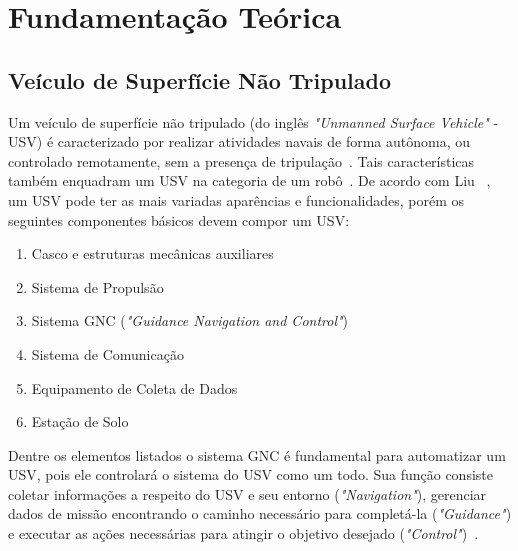 \chapter{Fundamentação Teórica}\label{chap2:fund_teo}
    \section{Veículo de Superfície Não Tripulado}\label{subchap2:USV}
        Um veículo de superfície não tripulado (do inglês \textit{"Unmanned Surface Vehicle"} - USV) é caracterizado por realizar atividades navais de forma autônoma, ou controlado remotamente, sem a presença de tripulação~\cite{LIU201671}. Tais características também enquadram um USV na categoria de um robô~\cite{JURAK2020}.
        De acordo com Liu \etal~\cite{LIU201671}, um USV pode ter as mais variadas aparências e funcionalidades, porém os seguintes componentes básicos devem compor um USV:
        
        \begin{enumerate}
            \item Casco e estruturas mecânicas auxiliares
            \item Sistema de Propulsão
            \item Sistema GNC (\textit{"Guidance Navigation and Control"})
            \item Sistema de Comunicação
            \item Equipamento de Coleta de Dados
            \item Estação de Solo
        \end{enumerate}
        
        Dentre os elementos listados o sistema GNC é fundamental para automatizar um USV, pois ele controlará o sistema do USV como um todo. Sua função consiste coletar informações a respeito do USV e seu entorno (\textit{"Navigation"}), gerenciar dados de missão encontrando o caminho necessário para completá-la (\textit{"Guidance"}) e executar as ações necessárias para atingir o objetivo desejado (\textit{"Control"})~\cite{LIU201671}.
        
